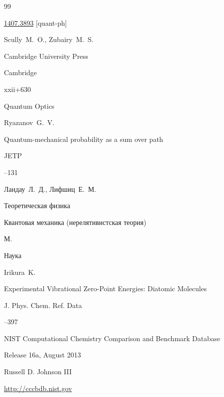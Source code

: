 \begin{thebibliography}{99}

\arxiv \href{http://arxiv.org/abs/1407.3893}{1407.3893} [quant-ph]







\by  Scully~M.~O., Zubairy~M.~S.

\publ Cambridge University Press

\publaddr Cambridge 



\totalpages xxii+630

\book Quantum Optics




\by Ryazanov~G.~V.

\paper Quantum-mechanical probability as a sum over path 

\jour JETP




--131




\by Ландау~Л.~Д., Лифшиц~Е.~М. 

\book Теоретическая физика


\volinfo Квантовая механика (нерелятивистская теория) 

\publaddr М.

\publ Наука







\by Irikura~K. 

\paper Experimental Vibrational Zero-Point Energies: Diatomic Molecules 

\jour J. Phys. Chem. Ref. Data




--397





\preprint NIST Computational Chemistry Comparison and Benchmark Database

\yr Release 16a, August 2013

\ed Russell D. Johnson III

\elink \url{http://cccbdb.nist.gov}







\end{thebibliography}
